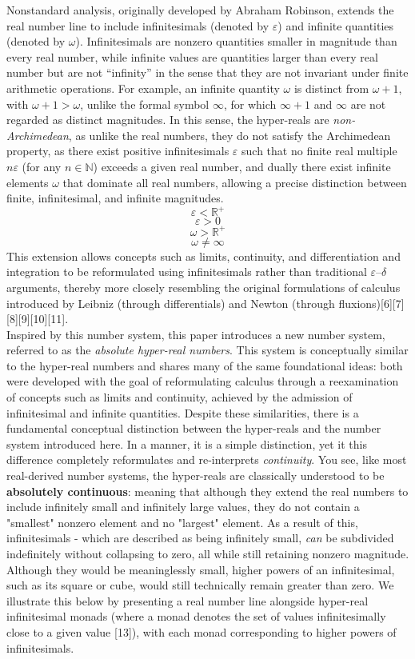 \documentclass{article}
\begin{document}
Nonstandard analysis, originally developed by Abraham Robinson, extends the real number line to include infinitesimals (denoted by $\varepsilon$) and infinite quantities (denoted by $\omega$). Infinitesimals are nonzero quantities smaller in magnitude than every real number, while infinite values are quantities larger than every real number but are not ``infinity'' in the sense that they are not invariant under finite arithmetic operations. For example, an infinite quantity $\omega$ is distinct from $\omega + 1$, with $\omega + 1 > \omega$, unlike the formal symbol $\infty$, for which $\infty + 1$ and $\infty$ are not regarded as distinct magnitudes. In this sense, the hyper-reals are \emph{non-Archimedean}, as unlike the real numbers, they do not satisfy the Archimedean property, as there exist positive infinitesimals $\varepsilon$ such that no finite real multiple $n\varepsilon$ (for any $n \in \mathbb{N}$) exceeds a given real number, and dually there exist infinite elements $\omega$ that dominate all real numbers, allowing a precise distinction between finite, infinitesimal, and infinite magnitudes.
$$\varepsilon<\mathbb{R^+}$$ $$\varepsilon>0$$$$\omega>\mathbb{R^+}$$ $$\omega\neq\infty$$This extension allows concepts such as limits, continuity, and differentiation and integration to be reformulated using infinitesimals rather than traditional $\varepsilon$--$\delta$ arguments, thereby more closely resembling the original formulations of calculus introduced by Leibniz (through differentials) and Newton (through fluxions)[6][7][8][9][10][11].\\Inspired by this number system, this paper introduces a new number system, referred to as the \emph{absolute hyper-real numbers}. This system is conceptually similar to the hyper-real numbers and shares many of the same foundational ideas: both were developed with the goal of reformulating calculus through a reexamination of concepts such as limits and continuity, achieved by the admission of infinitesimal and infinite quantities. Despite these similarities, there is a fundamental conceptual distinction between the hyper-reals and the number system introduced here. In a manner, it is a simple distinction, yet it this difference completely reformulates and re-interprets \textit{continuity}. You see, like most real-derived number systems, the hyper-reals are classically understood to be \textbf{absolutely continuous}: meaning that although they extend the real numbers to include infinitely small and infinitely large values, they do not contain a "smallest" nonzero element and no "largest" element. As a result of this, infinitesimals - which are described as being infinitely small, \textit{can} be subdivided indefinitely without collapsing to zero, all while still retaining nonzero magnitude. Although they would be meaninglessly small, higher powers of an infinitesimal, such as its square or cube, would still technically remain greater than zero. We illustrate this below by presenting a real number line alongside hyper-real infinitesimal monads (where a monad denotes the set of values infinitesimally close to a given value [13]), with each monad corresponding to higher powers of infinitesimals. 
\end{document}
